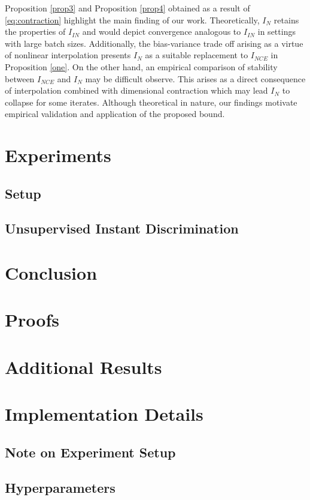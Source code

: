 \documentclass{article}
\begin{document}
Proposition \autoref{prop3} and Proposition \autoref{prop4} obtained as a result of \autoref{eq:contraction} highlight the main finding of our work. Theoretically, $I_{N}$ retains the properties of $I_{IN}$ and would depict convergence analogous to $I_{IN}$ in settings with large batch sizes. Additionally, the bias-variance trade off arising as a virtue of nonlinear interpolation presents $I_{N}$ as a suitable replacement to $I_{NCE}$ in Proposition \autoref{one}. On the other hand, an empirical comparison of stability between $I_{NCE}$ and $I_{N}$ may be difficult observe. This arises as a direct consequence of interpolation combined with dimensional contraction which may lead $I_{N}$ to collapse for some iterates. Although theoretical in nature, our findings motivate empirical validation and application of the proposed bound. 
\section{Experiments}
\subsection{Setup}

\subsection{Unsupervised Instant Discrimination}

\section{Conclusion}

 
\small{}

\newpage
\appendix
\section{Proofs}

\section{Additional Results}


\section{Implementation Details}

\subsection{Note on Experiment Setup}

\subsection{Hyperparameters}
\end{document}
